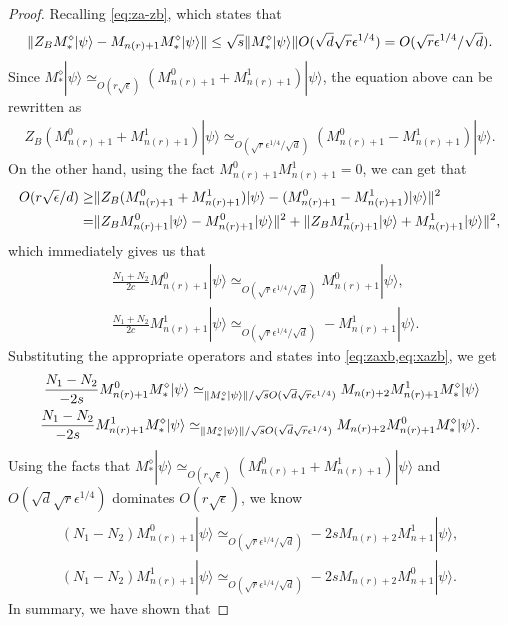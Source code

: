 \documentclass[11pt,letterpaper]{article}
\newcommand{\ket}[1]{|#1\rangle}
\DeclarePairedDelimiter{\norm}{\lVert}{\rVert}
\newcommand{\1}{\mathbb{1}}
\newcommand{\nr}{n(r)}
\newcommand{\se}{\sqrt{\epsilon}}
\newcommand{\qe}{\epsilon^{1/4}}
\newcommand{\sd}{\sqrt{d}}
\newcommand{\sr}{\sqrt{r}}
\newcommand{\appd}[1]{\simeq_{#1}}
\theoremstyle{definition}
\begin{document}
\begin{proof}
	Recalling \cref{eq:za-zb}, which states that
	\begin{align*}
		\norm{Z_B M_\ast^\diamond \ket{\psi} - M_{\nr+1}M_\ast^\diamond \ket{\psi}} \leq 
		\sqrt{s}\norm{M_\ast^\diamond \ket{\psi}} O(\sd \sr \qe)
		= O(\sr \qe/ \sd ).
	\end{align*}
	Since $M_\ast^\diamond \ket{\psi} \appd{O(r\se)} (M_{\nr+1}^0 + M_{\nr+1}^1) \ket{\psi}$,
	the equation above can be rewritten as 
	\begin{align*}
		Z_B (M_{\nr+1}^0 + M_{\nr+1}^1) \ket{\psi} \appd{O(\sr \qe / \sd )} (M_{\nr+1}^0 - M_{\nr+1}^1) \ket{\psi}.
	\end{align*}
	On the other hand, using the fact $M_{\nr+1}^0 M_{\nr+1}^1 = 0$, we can get that
	\begin{align*}
		O(r\se/d) \geq &\norm{Z_B (M_{\nr+1}^0 + M_{\nr+1}^1) \ket{\psi} - (M_{\nr+1}^0 - M_{\nr+1}^1) \ket{\psi}}^2\\
		=&\norm{ Z_BM_{\nr+1}^0 \ket{\psi} - M_{\nr+1}^0\ket{\psi}}^2 + \norm{ Z_BM_{\nr+1}^1 \ket{\psi} + M_{\nr+1}^1\ket{\psi}}^2,
	\end{align*}
	which immediately gives us that 
	\begin{align}
		&\frac{N_1+N_2}{2c} M_{\nr+1}^0\ket{\psi} \appd{O( \sr \qe /\sd)} M_{\nr+1}^0 \ket{\psi},\\
		&\frac{N_1+N_2}{2c} M_{\nr+1}^1\ket{\psi} \appd{O( \sr \qe /\sd)} -M_{\nr+1}^1 \ket{\psi}.
	\end{align}
		Substituting the appropriate operators and states into \cref{eq:zaxb,eq:xazb}, we get
	\begin{align*}
		\frac{N_1-N_2}{-2s} M_{\nr+1}^0M_\ast^\diamond \ket{\psi} 
		\appd{\norm{M_\ast^\diamond\ket{\psi}}/\sqrt{s} O(\sd \sr \qe)}M_{\nr+2} M_{\nr+1}^1M_\ast^\diamond\ket{\psi}\\
		\frac{N_1 -N_2}{-2s} M_{\nr+1}^1M_\ast^\diamond \ket{\psi}  
		\appd{\norm{M_\ast^\diamond \ket{\psi}}/\sqrt{s}O(\sd \sr \qe)}M_{\nr+2} M_{\nr+1}^0 M_\ast^\diamond \ket{\psi}.
	\end{align*}
	Using the facts that $M_\ast^\diamond \ket{\psi} \appd{O(r\se)} (M_{\nr+1}^0 + M_{\nr+1}^1) \ket{\psi}$
	and $O(\sd \sr \qe)$ dominates $O(r \se)$, we know
	\begin{align}
		(N_1-N_2) M_{\nr+1}^0 \ket{\psi} \appd{O(\sr\qe/\sd )} -2sM_{\nr+2} M_{n+1}^1 \ket{\psi},\\
		(N_1-N_2) M_{\nr+1}^1 \ket{\psi}\appd{O(\sr\qe/\sd )} -2sM_{\nr+2} M_{n+1}^0 \ket{\psi}.
	\end{align}
	In summary, we have shown that 

\end{proof}
\end{document}
